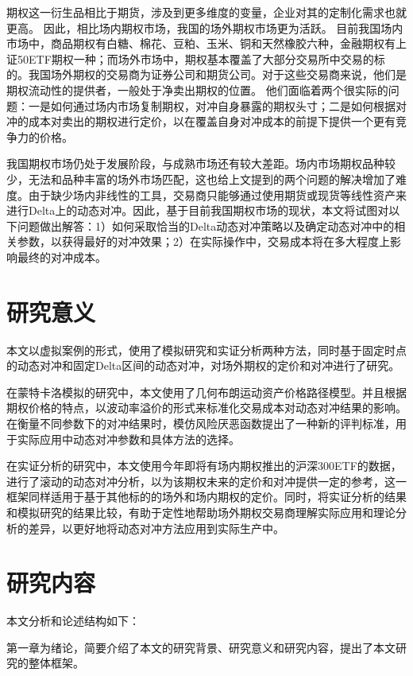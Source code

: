 期权这一衍生品相比于期货，涉及到更多维度的变量，企业对其的定制化需求也就更高。
因此，相比场内期权市场，我国的场外期权市场更为活跃。
目前我国场内市场中，商品期权有白糖、棉花、豆粕、玉米、铜和天然橡胶六种，金融期权有上证50ETF期权一种；而场外市场中，期权基本覆盖了大部分交易所中交易的标的。我国场外期权的交易商为证券公司和期货公司。对于这些交易商来说，他们是期权流动性的提供者，一般处于净卖出期权的位置。
他们面临着两个很实际的问题：一是如何通过场内市场复制期权，对冲自身暴露的期权头寸；二是如何根据对冲的成本对卖出的期权进行定价，以在覆盖自身对冲成本的前提下提供一个更有竞争力的价格。

我国期权市场仍处于发展阶段，与成熟市场还有较大差距。场内市场期权品种较少，无法和品种丰富的场外市场匹配，这也给上文提到的两个问题的解决增加了难度。由于缺少场内非线性的工具，交易商只能够通过使用期货或现货等线性资产来进行Delta上的动态对冲。因此，基于目前我国期权市场的现状，本文将试图对以下问题做出解答：1）如何采取恰当的Delta动态对冲策略以及确定动态对冲中的相关参数，以获得最好的对冲效果；2）在实际操作中，交易成本将在多大程度上影响最终的对冲成本。

\section{研究意义}

本文以虚拟案例的形式，使用了模拟研究和实证分析两种方法，同时基于固定时点的动态对冲和固定Delta区间的动态对冲，对场外期权的定价和对冲进行了研究。

在蒙特卡洛模拟的研究中，本文使用了几何布朗运动资产价格路径模型。并且根据期权价格的特点，以波动率溢价的形式来标准化交易成本对动态对冲结果的影响。在衡量不同参数下的对冲结果时，模仿风险厌恶函数提出了一种新的评判标准，用于实际应用中动态对冲参数和具体方法的选择。

在实证分析的研究中，本文使用今年即将有场内期权推出的沪深300ETF的数据，进行了滚动的动态对冲分析，以为该期权未来的定价和对冲提供一定的参考，这一框架同样适用于基于其他标的的场外和场内期权的定价。同时，将实证分析的结果和模拟研究的结果比较，有助于定性地帮助场外期权交易商理解实际应用和理论分析的差异，以更好地将动态对冲方法应用到实际生产中。

\section{研究内容}

本文分析和论述结构如下：

第一章为绪论，简要介绍了本文的研究背景、研究意义和研究内容，提出了本文研究的整体框架。

